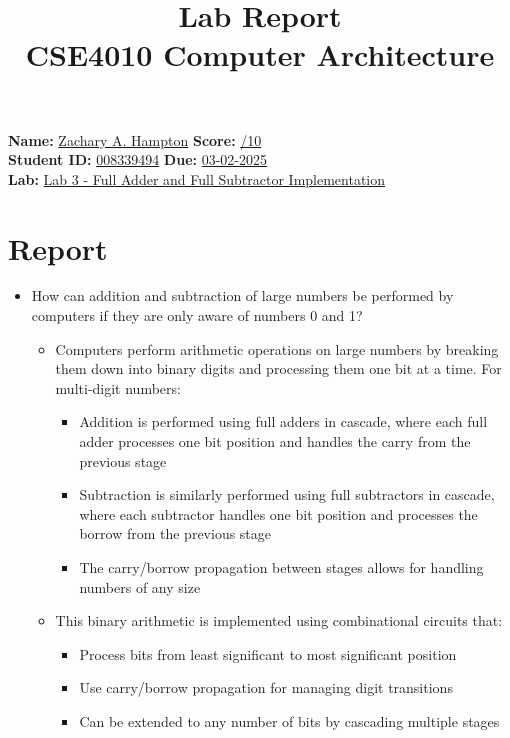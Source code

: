 \documentclass[a4paper,12pt]{article}
\title{Lab Report\\ CSE4010 Computer Architecture}
\author{}
\date{}
\begin{document}
\maketitle

\noindent \textbf{Name:} \underline{Zachary A. Hampton\hspace{5cm}} \hfill \textbf{Score:} \underline{\hspace{2cm}/10} \\
\textbf{Student ID:} \underline{008339494\hspace{6cm}} \hfill \textbf{Due:} \underline{03-02-2025} \\
\textbf{Lab:} \underline{Lab 3 - Full Adder and Full Subtractor Implementation\hspace{6cm}}

\section*{Report}
\begin{itemize}
    \item How can addition and subtraction of large numbers be performed by computers if they are only aware of numbers 0 and 1?
    \begin{itemize}
        \item Computers perform arithmetic operations on large numbers by breaking them down into binary digits and processing them one bit at a time. For multi-digit numbers:
        \begin{itemize}
            \item Addition is performed using full adders in cascade, where each full adder processes one bit position and handles the carry from the previous stage
            \item Subtraction is similarly performed using full subtractors in cascade, where each subtractor handles one bit position and processes the borrow from the previous stage
            \item The carry/borrow propagation between stages allows for handling numbers of any size
        \end{itemize}
        \item This binary arithmetic is implemented using combinational circuits that:
        \begin{itemize}
            \item Process bits from least significant to most significant position
            \item Use carry/borrow propagation for managing digit transitions
            \item Can be extended to any number of bits by cascading multiple stages
        \end{itemize}
    \end{itemize}
\end{itemize}
\end{document}
